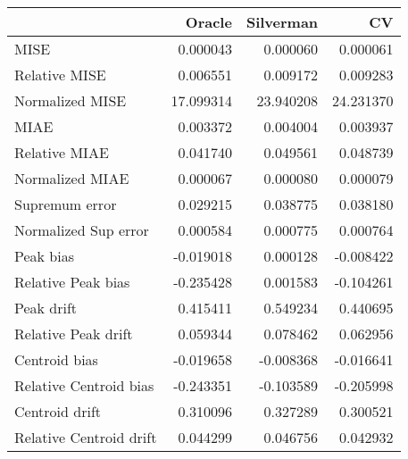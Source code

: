 \begin{tabular}{lrrr}
  \toprule
 & Oracle & Silverman & CV \\ 
  \midrule
MISE & 0.000043 & 0.000060 & 0.000061 \\ 
  Relative MISE & 0.006551 & 0.009172 & 0.009283 \\ 
  Normalized MISE & 17.099314 & 23.940208 & 24.231370 \\ 
  MIAE & 0.003372 & 0.004004 & 0.003937 \\ 
  Relative MIAE & 0.041740 & 0.049561 & 0.048739 \\ 
  Normalized MIAE & 0.000067 & 0.000080 & 0.000079 \\ 
  Supremum error & 0.029215 & 0.038775 & 0.038180 \\ 
  Normalized Sup error & 0.000584 & 0.000775 & 0.000764 \\ 
  Peak bias & -0.019018 & 0.000128 & -0.008422 \\ 
  Relative Peak bias & -0.235428 & 0.001583 & -0.104261 \\ 
  Peak drift & 0.415411 & 0.549234 & 0.440695 \\ 
  Relative Peak drift & 0.059344 & 0.078462 & 0.062956 \\ 
  Centroid bias & -0.019658 & -0.008368 & -0.016641 \\ 
  Relative Centroid bias & -0.243351 & -0.103589 & -0.205998 \\ 
  Centroid drift & 0.310096 & 0.327289 & 0.300521 \\ 
  Relative Centroid drift & 0.044299 & 0.046756 & 0.042932 \\ 
   \bottomrule
\end{tabular}
